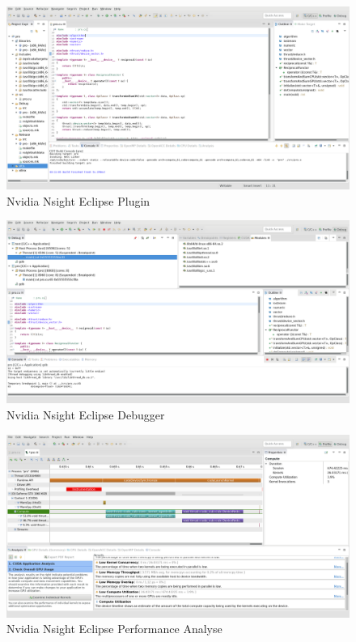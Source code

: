                     \begin{figure}[h]
			            \centering
			            \includegraphics[width=\textwidth]{chapter3/pictures/NEplugin.png}
			            \caption{Nvidia Nsight Eclipse Plugin}
			            \label{fig3:neplugin}
                    \end{figure}
                    \begin{figure}[h]
			            \centering
			            \includegraphics[width=\textwidth]{chapter3/pictures/NEdebug.png}
			            \caption{Nvidia Nsight Eclipse Debugger}
			            \label{fig3:nedebug}
                    \end{figure}
                    \begin{figure}[h]
			            \centering
			            \includegraphics[width=\textwidth]{chapter3/pictures/NEact.png}
			            \caption{Nvidia Nsight Eclipse Performance Analyse}
			            \label{fig3:neact}
			        \end{figure}
			        \FloatBarrier
			        
